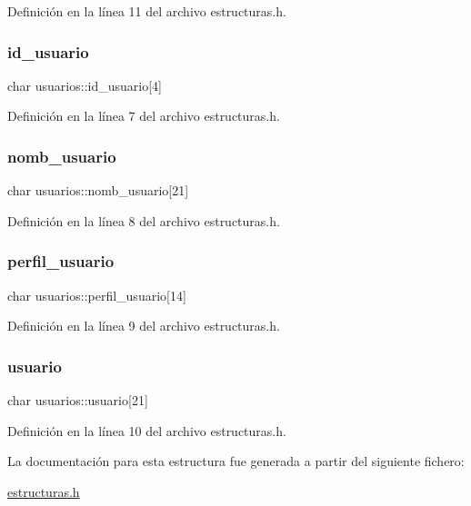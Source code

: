 Definición en la línea 11 del archivo estructuras.\+h.

\mbox{\label{structusuarios_a5090e2f56888f1a9873bd9ed35bf46d3}} 
\subsubsection{\texorpdfstring{id\+\_\+usuario}{id\_usuario}}
{\footnotesize\ttfamily char usuarios\+::id\+\_\+usuario\mbox{[}4\mbox{]}}



Definición en la línea 7 del archivo estructuras.\+h.

\mbox{\label{structusuarios_acf2d33748c720f047d2a0e512e187fd5}} 
\subsubsection{\texorpdfstring{nomb\+\_\+usuario}{nomb\_usuario}}
{\footnotesize\ttfamily char usuarios\+::nomb\+\_\+usuario\mbox{[}21\mbox{]}}



Definición en la línea 8 del archivo estructuras.\+h.

\mbox{\label{structusuarios_afe590222f989c0e30b72bbc0014868cc}} 
\subsubsection{\texorpdfstring{perfil\+\_\+usuario}{perfil\_usuario}}
{\footnotesize\ttfamily char usuarios\+::perfil\+\_\+usuario\mbox{[}14\mbox{]}}



Definición en la línea 9 del archivo estructuras.\+h.

\mbox{\label{structusuarios_a3330601c31921ae73c6fa7551a68a0da}} 
\subsubsection{\texorpdfstring{usuario}{usuario}}
{\footnotesize\ttfamily char usuarios\+::usuario\mbox{[}21\mbox{]}}



Definición en la línea 10 del archivo estructuras.\+h.



La documentación para esta estructura fue generada a partir del siguiente fichero\+:\begin{DoxyCompactItemize}
\item 
\mbox{\hyperlink{estructuras_8h}{estructuras.\+h}}\end{DoxyCompactItemize}
